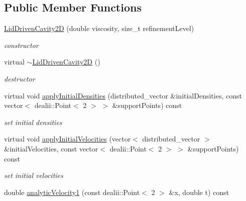 \subsection*{Public Member Functions}
\begin{DoxyCompactItemize}
\item 
\hyperlink{classnatrium_1_1LidDrivenCavity2D_a27c7eaba95a6876f6b4f4592b5afa104}{Lid\-Driven\-Cavity2\-D} (double viscosity, size\-\_\-t refinement\-Level)
\begin{DoxyCompactList}\small\item\em constructor \end{DoxyCompactList}\item 
\hypertarget{classnatrium_1_1LidDrivenCavity2D_a8ae5029b008eb3d3c810bae81440b29c}{virtual \hyperlink{classnatrium_1_1LidDrivenCavity2D_a8ae5029b008eb3d3c810bae81440b29c}{$\sim$\-Lid\-Driven\-Cavity2\-D} ()}\label{classnatrium_1_1LidDrivenCavity2D_a8ae5029b008eb3d3c810bae81440b29c}

\begin{DoxyCompactList}\small\item\em destructor \end{DoxyCompactList}\item 
virtual void \hyperlink{classnatrium_1_1LidDrivenCavity2D_ab4a8629cfd3472847d40cf42a4ca72a8}{apply\-Initial\-Densities} (distributed\-\_\-vector \&initial\-Densities, const vector$<$ dealii\-::\-Point$<$ 2 $>$ $>$ \&support\-Points) const 
\begin{DoxyCompactList}\small\item\em set initial densities \end{DoxyCompactList}\item 
virtual void \hyperlink{classnatrium_1_1LidDrivenCavity2D_a6e633e30cfeae500757bdd4c37a5c478}{apply\-Initial\-Velocities} (vector$<$ distributed\-\_\-vector $>$ \&initial\-Velocities, const vector$<$ dealii\-::\-Point$<$ 2 $>$ $>$ \&support\-Points) const 
\begin{DoxyCompactList}\small\item\em set initial velocities \end{DoxyCompactList}\item 
\hypertarget{classnatrium_1_1LidDrivenCavity2D_a35bd8e7b30690dd85f4c6931f62aaa53}{double \hyperlink{classnatrium_1_1LidDrivenCavity2D_a35bd8e7b30690dd85f4c6931f62aaa53}{analytic\-Velocity1} (const dealii\-::\-Point$<$ 2 $>$ \&x, double t) const }\label{classnatrium_1_1LidDrivenCavity2D_a35bd8e7b30690dd85f4c6931f62aaa53}


\end{DoxyCompactItemize}
